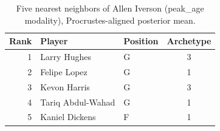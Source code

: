 \begin{table}[htbp]
  \centering\small
  \begin{tabular}{rllc}
    \toprule
    Rank & Player & Position & Archetype \\
    \midrule
    1 & Larry Hughes & G & 3 \\
    2 & Felipe Lopez & G & 1 \\
    3 & Kevon Harris & G & 3 \\
    4 & Tariq Abdul-Wahad & G & 1 \\
    5 & Kaniel Dickens & F & 1 \\
    \bottomrule
  \end{tabular}
  \caption{Five nearest neighbors of Allen Iverson (peak_age modality), Procrustes-aligned posterior mean.}
  \label{tab:Allen_Iverson_neighbors_peak_age}
\end{table}

